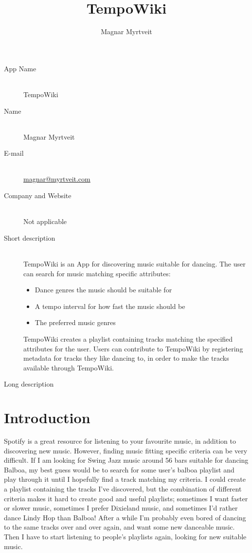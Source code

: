 \documentclass[a4paper, 12pt]{article}
\title{TempoWiki}
\author{Magnar Myrtveit}
\begin{document}
\begin{description}
\item[App Name] \hfill \\
TempoWiki
\item[Name] \hfill \\
Magnar Myrtveit
\item[E-mail] \hfill \\
\href{mailto:magnar@myrtveit.com}{magnar@myrtveit.com}
\item[Company and Website] \hfill \\
Not applicable
\item[Short description] \hfill \\
TempoWiki is an App for discovering music suitable for dancing. The user can search for music matching specific attributes:
\begin{itemize}
\item Dance genres the music should be suitable for
\item A tempo interval for how fast the music should be
\item The preferred music genres 
\end{itemize}
TempoWiki creates a playlist containing tracks matching the specified attributes for the user. Users can contribute to TempoWiki by registering metadata for tracks they like dancing to, in order to make the tracks available through TempoWiki.
\item[Long description]
\end{description}
\section{Introduction}
Spotify is a great resource for listening to your favourite music, in addition to discovering new music. However, finding music fitting specific criteria can be very difficult. If I am looking for Swing Jazz music around 56 bars suitable for dancing Balboa, my best guess would be to search for some user's balboa playlist and play through it until I hopefully find a track matching my criteria. I could create a playlist containing the tracks I've discovered, but the combination of different criteria makes it hard to create good and useful playlists; sometimes I want faster or slower music, sometimes I prefer Dixieland music, and sometimes I'd rather dance Lindy Hop than Balboa! After a while I'm probably even bored of dancing to the same tracks over and over again, and want some new danceable music. Then I have to start listening to people's playlists again, looking for new suitable music.
\end{document}
